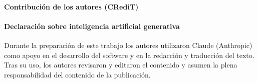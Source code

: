 \paragraph{Contribución de los autores (CRediT)} 

\paragraph{Declaración sobre inteligencia artificial generativa} Durante la preparación de este
trabajo los autores utilizaron Claude (Anthropic) como apoyo en el desarrollo del software y en la
redacción y traducción del texto. Tras su uso, los autores revisaron y editaron el contenido y
asumen la plena responsabilidad del contenido de la publicación.
\normalsize
